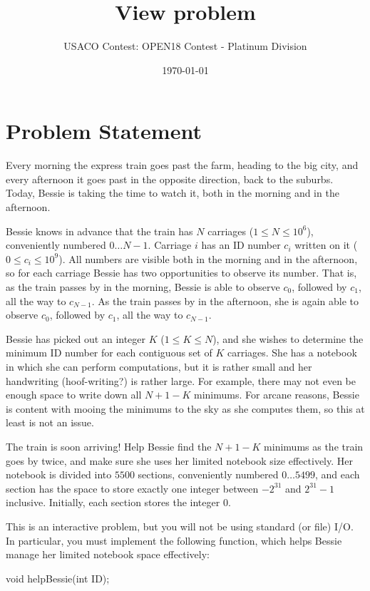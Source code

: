 \documentclass[12pt]{article}
\title{View problem}
\author{USACO Contest: OPEN18 Contest - Platinum Division}
\date{\today}
\begin{document}
\maketitle

\section*{Problem Statement}

Every morning the express train goes past the farm, heading to the big city, and
every afternoon it goes past in the opposite direction, back to the suburbs.
Today, Bessie is taking the time to watch it, both in the morning and in the
afternoon.

Bessie knows in advance that the train has $N$ carriages ($1 \leq N \leq 10^6$),
conveniently numbered $0 \dots N-1$. Carriage $i$ has an ID number $c_i$ written
on it ($0 \le c_i \le 10^9$). All numbers are visible both in the morning and in
the afternoon, so for each carriage Bessie has two opportunities to observe its
number. That is, as the train passes by in the morning, Bessie is able to
observe $c_0$, followed by $c_1$, all the way to $c_{N-1}$. As the train passes
by in the afternoon, she is again able to observe $c_0$, followed by $c_1$, all
the way to $c_{N-1}$.

Bessie has picked out an integer $K$ ($1 \leq K \leq N$), and she wishes to 
determine the minimum ID number for each contiguous set of $K$ carriages. She
has a notebook in which she can perform computations, but it is rather small and
her handwriting (hoof-writing?) is rather large. For example, there may not even
be enough space to write down all $N+1-K$ minimums. For arcane reasons, Bessie
is content with mooing the minimums to the sky as she computes them, so this at
least is not an issue.

The train is soon arriving! Help Bessie find the $N + 1 - K$ minimums as the
train goes by twice, and make sure she uses her limited notebook size
effectively. Her notebook is divided into $5500$ sections, conveniently numbered
$0 \dots 5499$, and each section has the space to store exactly one integer
between $-2^{31}$ and $2^{31}-1$ inclusive. Initially, each section stores the
integer $0$.

This is an interactive problem, but you will not be using standard (or file)
I/O. In particular, you must implement the following function, which helps
Bessie manage her limited notebook space effectively:

void helpBessie(int ID);
\end{document}
